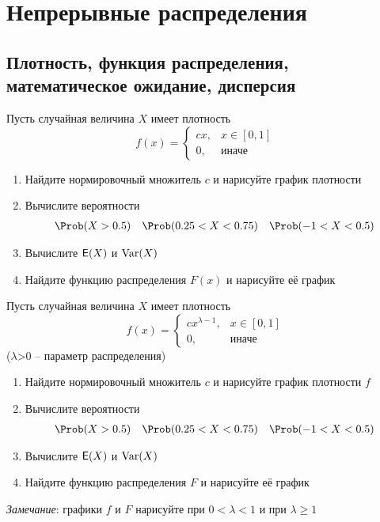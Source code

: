 
\section{Непрерывные распределения}

\subsection{Плотность, функция распределения, математическое ожидание, дисперсия}

\begin{exercise}
Пусть случайная величина \(X\) имеет плотность
\[
	f(x)=\begin{cases}
	cx, & x\in[0,1] \\ 0, & \text{иначе}
	\end{cases}
\]
\begin{enumerate}
	\item Найдите нормировочный множитель \(c\) и нарисуйте график плотности
	\item Вычислите вероятности
	\begin{align*}
		\Prob&(X>0.5) & \Prob&(0.25<X<0.75) & \Prob(-1<X<0.5)
	\end{align*}
	\item Вычислите \({\mathsf E}(X)\) и \(\operatorname{Var}(X)\)
	\item Найдите функцию распределения \(F(x)\) и нарисуйте её график
\end{enumerate}
\end{exercise}

\begin{exercise}
Пусть случайная величина \(X\) имеет плотность 
\[
	f(x)=\begin{cases}
	cx^{\lambda-1}, & x\in[0,1] \\ 0, & \text{иначе}
	\end{cases}
\]
(\(\lambda\)>0 -- параметр распределения)
\begin{enumerate}
	\item Найдите нормировочный множитель \(c\) и нарисуйте график плотности \(f\)
	\item Вычислите вероятности
	\begin{align*}
		\Prob&(X>0.5) & \Prob&(0.25<X<0.75) & \Prob(-1<X<0.5)
	\end{align*}
	\item Вычислите \({\mathsf E}(X)\) и \(\operatorname{Var}(X)\)
	\item Найдите функцию распределения \(F\) и нарисуйте её график
\end{enumerate}
\textit{Замечание}: графики \(f\) и  \(F\) нарисуйте при \(0<\lambda<1\) и при \(\lambda\geq 1\)
\end{exercise}

